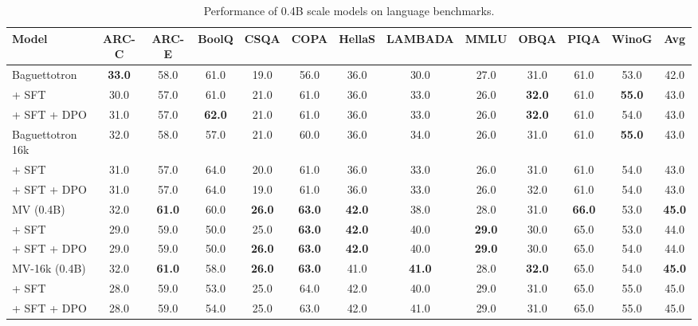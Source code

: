 \begin{table}[ht]
\centering
\caption{Performance of 0.4B scale models on language benchmarks.}
\label{tab:lang_eval_table4}
\scriptsize
\begin{tabular}{lcccccccccccc}
\toprule
\textbf{Model} & \textbf{ARC-C} & \textbf{ARC-E} & \textbf{BoolQ} & \textbf{CSQA} & \textbf{COPA} & \textbf{HellaS} & \textbf{LAMBADA} & \textbf{MMLU} & \textbf{OBQA} & \textbf{PIQA} & \textbf{WinoG} & \textbf{Avg} \\
\midrule
Baguettotron & \textbf{33.0} & 58.0 & 61.0 & 19.0 & 56.0 & 36.0 & 30.0 & 27.0 & 31.0 & 61.0 & 53.0 & 42.0 \\
\quad + SFT & 30.0 & 57.0 & 61.0 & 21.0 & 61.0 & 36.0 & 33.0 & 26.0 & \textbf{32.0} & 61.0 & \textbf{55.0} & 43.0 \\
\quad + SFT + DPO & 31.0 & 57.0 & \textbf{62.0} & 21.0 & 61.0 & 36.0 & 33.0 & 26.0 & \textbf{32.0} & 61.0 & 54.0 & 43.0 \\
\midrule
\addlinespace[0.3em]
Baguettotron 16k & 32.0 & 58.0 & 57.0 & 21.0 & 60.0 & 36.0 & 34.0 & 26.0 & 31.0 & 61.0 & \textbf{55.0} & 43.0 \\
\quad + SFT & 31.0 & 57.0 & 64.0 & 20.0 & 61.0 & 36.0 & 33.0 & 26.0 & 31.0 & 61.0 & 54.0 & 43.0 \\
\quad + SFT + DPO & 31.0 & 57.0 & 64.0 & 19.0 & 61.0 & 36.0 & 33.0 & 26.0 & 32.0 & 61.0 & 54.0 & 43.0 \\
\midrule
\addlinespace[0.3em]
MV (0.4B) & 32.0 & \textbf{61.0} & 60.0 & \textbf{26.0} & \textbf{63.0} & \textbf{42.0} & 38.0 & 28.0 & 31.0 & \textbf{66.0} & 53.0 & \textbf{45.0} \\
\quad + SFT & 29.0 & 59.0 & 50.0 & 25.0 & \textbf{63.0} & \textbf{42.0} & 40.0 & \textbf{29.0} & 30.0 & 65.0 & 53.0 & 44.0 \\
\quad + SFT + DPO & 29.0 & 59.0 & 50.0 & \textbf{26.0} & \textbf{63.0} & \textbf{42.0} & 40.0 & \textbf{29.0} & 30.0 & 65.0 & 54.0 & 44.0 \\
\midrule
\addlinespace[0.3em]
MV-16k (0.4B) & 32.0 & \textbf{61.0} & 58.0 & \textbf{26.0} & \textbf{63.0} & 41.0 & \textbf{41.0} & 28.0 & \textbf{32.0} & 65.0 & 54.0 & \textbf{45.0} \\
\quad + SFT & 28.0 & 59.0 & 53.0 & 25.0 & 64.0 & 42.0 & 40.0 & 29.0 & 31.0 & 65.0 & 55.0 & 45.0 \\
\quad + SFT + DPO & 28.0 & 59.0 & 54.0 & 25.0 & 63.0 & 42.0 & 41.0 & 29.0 & 31.0 & 65.0 & 55.0 & 45.0 \\
\bottomrule
\end{tabular}
\end{table}

